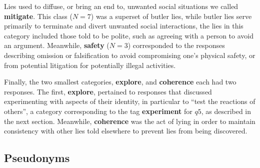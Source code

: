 \documentclass{sig-alternate}
\newcommand{\fig}[3][1.0]{
\begin{figure}[tbp]
\begin{center}
\texttt{[image: figs/\#2]}
\protect\caption{#3}
\label{fig:#2}
\end{center}
\end{figure}
}
\begin{document}
Lies used to diffuse, or bring an end to, unwanted social situations we called \textbf{mitigate}.  This class ($N=7$) was a superset of butler lies, while butler lies serve primarily to terminate and divert unwanted social interactions, the lies in this category included those told to be polite, such as agreeing with a person to avoid an argument. Meanwhile, \textbf{safety} ($N=3$) corresponded to the responses describing omission or falsification to avoid compromising one's physical safety, or from potential litigation for potentially illegal activities.

Finally, the two smallest categories, \textbf{explore}, and \textbf{coherence} each had two responses.  The first, \textbf{explore}, pertained to responses that discussed experimenting with aspects of their identity, in particular to ``test the reactions of others'', a category corresponding to the tag \textbf{experiment} for $q5$, as described in the next section.  Meanwhile, \textbf{coherence} was the act of lying in order to maintain  consistency with other lies told elsewhere to prevent lies from being discovered. 






\subsection{Pseudonyms}
\label{sec:pseudonyms}
\end{document}
